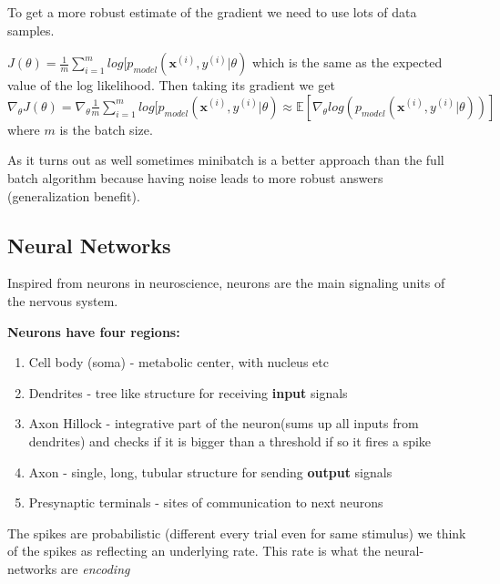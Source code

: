 \documentclass[twocolumn, letter, 10pt, landscape]{article}
\newcommand{\mb}{\mathbf}
\newcommand{\tb}{\textbf}
\newcommand{\ti}{\textit}
\newcommand{\ben}{\vspace{-0.1in}\begin{enumerate}\setlength\itemsep{-0.05in}}
\newcommand{\een}{\end{enumerate}}
\begin{document}


To get a more robust estimate of the gradient we need to use lots of data samples. 

$J(\theta) = \frac{1}{m}\sum_{i=1}^m log[p_{model}(\mb{x}^{(i)}, y^{(i)} | \theta)$ which is the same as the expected value of the log likelihood. Then taking its gradient we get $\nabla_\theta J(\theta) = \nabla_\theta\frac{1}{m}\sum_{i=1}^m log[p_{model}(\mb{x}^{(i)}, y^{(i)} | \theta) \approx \mathbb{E}[\nabla_\theta log(p_{model}(\mb{x}^{(i)},y^{(i)}|\theta))]$ where $m$ is the batch size. 

As it turns out as well sometimes minibatch is a better approach than the full batch algorithm because having noise leads to more robust answers (generalization benefit).

\subsection{Neural Networks}
Inspired from neurons in neuroscience, neurons are the main signaling units of the nervous system.

\tb{Neurons have four regions:}
\ben{}
\item Cell body (soma) - metabolic center, with nucleus etc
\item Dendrites - tree like structure for receiving \tb{input} signals
\item Axon Hillock - integrative part of the neuron(sums up all inputs from dendrites) and checks if it is bigger than a threshold if so it fires a spike
\item Axon - single, long, tubular structure for sending \tb{output} signals
\item Presynaptic terminals - sites of communication to next neurons
\een{}

The spikes are probabilistic (different every trial even for same stimulus) we think of the spikes as reflecting an underlying rate. This rate is what the neural-networks are \ti{encoding}
\end{document}
